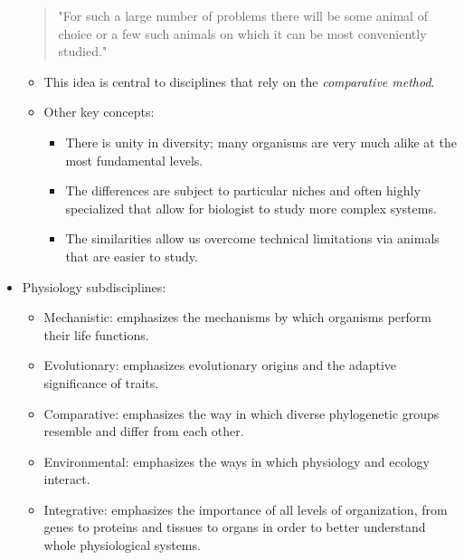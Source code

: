 \documentclass[12pt,a4paper]{article}
\begin{document}
\begin{itemize}
\begin{quote}
        "For such a large number of problems there will be some animal of choice or a few such animals on which it can be most conveniently studied."\end{quote}
        \begin{itemize}
            \item This idea is central to disciplines that rely on the \textit{comparative method}.
            \item Other key concepts:
                \begin{itemize}
                    \item There is unity in diversity; many organisms are very much alike at the most fundamental levels. 
                    \item The differences are subject to particular niches and often highly specialized that allow for biologist to study more complex systems.
                    \item The similarities allow us overcome technical limitations via animals that are easier to study.
                \end{itemize}
        \end{itemize}
    \item Physiology subdisciplines: 
        \begin{itemize}
            \item Mechanistic: emphasizes the mechanisms by which organisms perform their life functions.
            \item Evolutionary: emphasizes evolutionary origins and the adaptive significance of traits.
            \item Comparative: emphasizes the way in which diverse phylogenetic groups resemble and differ from each other.
            \item Environmental: emphasizes the ways in which physiology and ecology interact.
            \item Integrative: emphasizes the importance of all levels of organization, from genes to proteins and tissues to organs in order to better understand whole physiological systems.
        \end{itemize}
\end{itemize}
\end{document}
